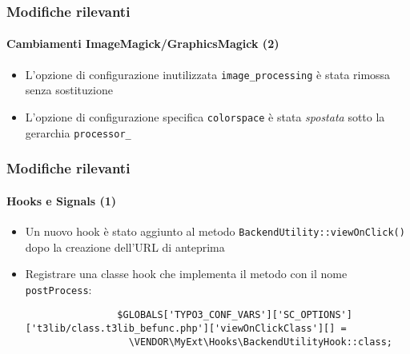 \begin{frame}[fragile]
	\frametitle{Modifiche rilevanti}
	\framesubtitle{Cambiamenti ImageMagick/GraphicsMagick (2)}

	\lstset{basicstyle=\tiny\ttfamily}

	\begin{itemize}

		\item L'opzione di configurazione inutilizzata \texttt{image\_processing} è stata rimossa senza sostituzione

		\item L'opzione di configurazione specifica \texttt{colorspace} è stata \textit{spostata}
			sotto la gerarchia \texttt{processor\_}

	\end{itemize}

\end{frame}

\begin{frame}[fragile]
	\frametitle{Modifiche rilevanti}
	\framesubtitle{Hooks e Signals (1)}

	\lstset{basicstyle=\tiny\ttfamily}

	\begin{itemize}

		\item Un nuovo hook è stato aggiunto al metodo \texttt{BackendUtility::viewOnClick()}
			dopo la creazione dell'URL di anteprima

		\item Registrare una classe hook che implementa il metodo con il nome \texttt{postProcess}:

			\begin{lstlisting}
				$GLOBALS['TYPO3_CONF_VARS']['SC_OPTIONS']['t3lib/class.t3lib_befunc.php']['viewOnClickClass'][] =
				  \VENDOR\MyExt\Hooks\BackendUtilityHook::class;
			\end{lstlisting}

	\end{itemize}

\end{frame}

